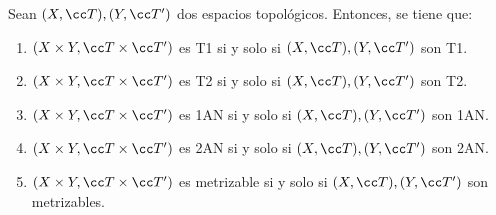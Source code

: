 \begin{prop} \label{prop:TopoProducto_Propiedades}
    Sean $(X,\T), (Y,\T')$ dos espacios topológicos. Entonces, se tiene que:
    \begin{enumerate}
        \item $(X\times Y, \T\times \T')$ es T1 si y solo si $(X,\T), (Y,\T')$ son T1.
        \item $(X\times Y, \T\times \T')$ es T2 si y solo si $(X,\T), (Y,\T')$ son T2.
        \item $(X\times Y, \T\times \T')$ es 1AN si y solo si $(X,\T), (Y,\T')$ son 1AN.
        \item $(X\times Y, \T\times \T')$ es 2AN si y solo si $(X,\T), (Y,\T')$ son 2AN.
        \item $(X\times Y, \T\times \T')$ es metrizable si y solo si $(X,\T), (Y,\T')$ son metrizables.
    \end{enumerate}
\end{prop}


